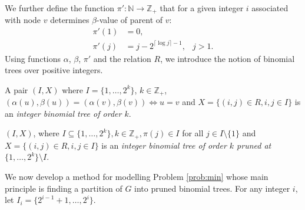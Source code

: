 We further define the function $\pi':\mathbb{N}\to\mathbb{Z}_+$ that for a given integer $i$ associated with node $v$
determines $\beta$-value of parent of $v$: 
\begin{align*}
\label{eq:piprime}
\pi'(1)&=0,& \\
\pi'(j)&=j-2^{\lceil\log j\rceil -1}, &j > 1.
\end{align*}
Using functions $\alpha$, $\beta$, $\pi'$ and the relation $R$, we introduce the notion of binomial trees over positive integers.
\begin{definition}
A pair $(I,X)$ where $I=\{1,\dots,2^k\}$, $k\in\mathbb{Z}_+$, $(\alpha(u),\beta(u))=(\alpha(v),\beta(v))\Leftrightarrow u=v$ and
$X=\{(i,j)\in R, i,j\in I\}$ is an \emph{integer binomial tree of order $k$}. 

$(I,X)$, where $I\subseteq\{1,\dots,2^k\}, k\in \mathbb{Z}_+,\pi(j)\in I$ for all $j\in I\setminus\{1\}$ and
$X=\{(i,j)\in R, i,j\in I\}$ is an \emph{integer binomial tree of order $k$ pruned at $\{1,\dots,2^k\}\setminus I$}.
\end{definition}
We now develop a method for modelling Problem \ref{prob:min} whose main principle is finding a partition of $G$ into pruned binomial trees.
For any integer $i$, let $I_i=\{2^{i-1}+1,\dots,2^i\}$.

